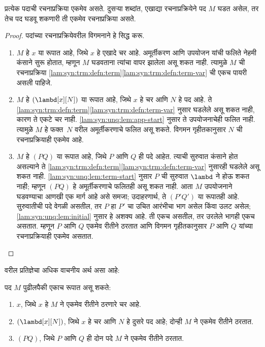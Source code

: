 \begin{prop}[एकमेव वाचनीयता] \label{lam:syn:unq:prop:unq}
प्रत्येक पदाची रचनाप्रक्रिया एकमेव असते. दुसऱ्या
शब्दांत, एखाद्या रचनाप्रक्रियेने पद $M$ घडत असेल,
तर तेच पद घडवू शकणारी ती एकमेव रचनाप्रक्रिया असते.
\end{prop}

\begin{proof}
पदांच्या रचनाप्रक्रियेवरील विगमनाने हे सिद्ध करू.
  \begin{enumerate}
    \item $M$ हे $x$ या रूपात आहे, जिथे $x$ हे
      एखादे चर आहे. अमूर्तीकरण आणि उपयोजन यांची
      फलिते नेहमी कंसाने सुरू होतात, म्हणून $M$
      घडवताना त्यांचा वापर झालेला असू शकत नाही.
      त्यामुळे $M$ ची रचनाप्रक्रिया
      \ref{lam:syn:trm:defn:term}\ref{lam:syn:trm:defn:term-var}
      ची एकच पायरी असली पाहिजे.
    \item $M$ हे $(\lambd[x][N])$ या रूपात आहे,
      जिथे $x$ हे चर आणि $N$ हे पद आहे. ते
      \ref{lam:syn:trm:defn:term}\ref{lam:syn:trm:defn:term-var}
      नुसार घडलेले असू शकत नाही, कारण ते एकटे
      चर नाही. \ref{lam:syn:unq:lem:app-start} नुसार ते
      उपयोजनाचेही फलित नाही. त्यामुळे $M$ हे
      फक्त~$N$ वरील अमूर्तीकरणाचे फलित असू शकते.
      विगमन गृहीतकानुसार $N$ ची रचनाप्रक्रियाही
      एकमेव आहे.
    \item $M$ हे $(PQ)$ या रूपात आहे, जिथे $P$
      आणि $Q$ ही पदे आहेत. त्याची सुरुवात कंसाने
      होत असल्याने ते
      \ref{lam:syn:trm:defn:term}\ref{lam:syn:trm:defn:term-var}
      नुसारही घडलेले असू शकत नाही.
      \ref{lam:syn:unq:lem:term-start} नुसार $P$ ची सुरुवात
      $\lambd$ ने होऊ शकत नाही; म्हणून $(PQ)$ हे
      अमूर्तीकरणाचे फलितही असू शकत नाही. आता $M$
      उपयोजनाने घडवण्याचा आणखी एक मार्ग आहे असे
      समजा; उदाहरणार्थ, ते $(P'Q')$ या रूपातही
      आहे. सुरुवातीची पदे वेगळी असतील, तर $P$
      हा $P'$ चा उचित आरंभीचा भाग असेल किंवा
      उलट असेल; \ref{lam:syn:unq:lem:initial} नुसार हे
      अशक्य आहे. ती एकच असतील, तर उरलेले भागही
      एकच असतात. म्हणून $P$ आणि $Q$ एकमेव
      रीतीने ठरतात आणि विगमन गृहीतकानुसार $P$
      आणि $Q$ यांच्या रचनाप्रक्रियाही एकमेव असतात.
  \end{enumerate}
\end{proof}

वरील प्रतिज्ञेचा अधिक वाचनीय अर्थ असा आहे:
\begin{prop}
  पद $M$ पुढीलपैकी एकाच रूपात असू शकते:
  \begin{enumerate}
    \item $x$, जिथे $x$ हे $M$ ने एकमेव रीतीने
      ठरणारे चर आहे.
    \item $(\lambd[x][N])$, जिथे $x$ हे चर आणि
      $N$ हे दुसरे पद आहे; दोन्ही $M$ ने एकमेव
      रीतीने ठरतात.
    \item $(PQ)$, जिथे $P$ आणि $Q$ ही दोन पदे
      $M$ ने एकमेव रीतीने ठरतात.
  \end{enumerate}
\end{prop}











